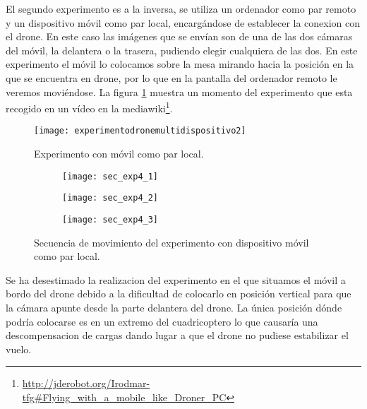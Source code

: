 El segundo experimento es a la inversa, se utiliza un ordenador como par remoto y un dispositivo móvil como par local, encargándose de establecer la conexion con el drone. En este caso las imágenes que se envían son de una de las dos cámaras del móvil, la delantera o la trasera, pudiendo elegir cualquiera de las dos. En este experimento el móvil lo colocamos sobre la mesa mirando hacia la posición en la que se encuentra en drone, por lo que en la pantalla del ordenador remoto le veremos moviéndose. La figura \ref{fig:experimentodronemultidispositivo2} muestra un momento del experimento que esta recogido en un vídeo en la mediawiki\footnote{\url{http://jderobot.org/Irodmar-tfg#Flying_with_a_mobile_like_Droner_PC}}.\\

\begin{figure}[h!]
\centering
\texttt{[image: experimentodronemultidispositivo2]}
\caption{Experimento con móvil como par local.}
\label{fig:experimentodronemultidispositivo2}
\end{figure}


\begin{figure}[h!]
\centering
  \begin{subfigure}[]{48mm}
    \texttt{[image: sec\_exp4\_1]}
  \end{subfigure}
  \hspace{1pt}
  \begin{subfigure}[]{48mm}
    \texttt{[image: sec\_exp4\_2]}
  \end{subfigure}
    \hspace{1pt}
    \begin{subfigure}[]{48mm}
    \texttt{[image: sec\_exp4\_3]}
  \end{subfigure}
    \caption{Secuencia de movimiento del experimento con dispositivo móvil como par local.}
  \label{fig:secexp4}
\end{figure}

Se ha desestimado la realizacion del experimento en el que situamos el móvil a bordo del drone debido a la dificultad de colocarlo en posición vertical para que la cámara apunte desde la parte delantera del drone. La única posición dónde podría colocarse es en un extremo del cuadricoptero lo que causaría una descompensacion de cargas dando lugar a que el drone no pudiese estabilizar el vuelo.\\

